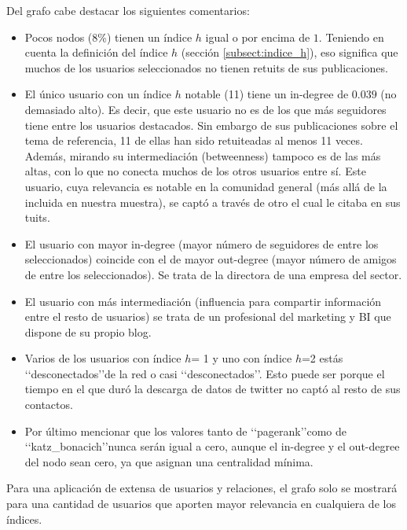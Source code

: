 Del grafo cabe destacar los siguientes comentarios:
\begin{itemize}
\item Pocos nodos ($8$\%) tienen un índice $h$ igual o por encima de $1$. Teniendo en cuenta 
la definición del índice $h$ (sección \ref{subsect:indice_h}), eso significa que muchos de los 
usuarios seleccionados no tienen retuits de sus publicaciones.

\item El único usuario con un índice $h$ notable (11) tiene un in-degree de $0.039$ (no demasiado alto). 
Es decir, que este usuario no es de los que más seguidores tiene entre los usuarios destacados. Sin
embargo de sus publicaciones sobre el tema de referencia, 11 de ellas han sido retuiteadas al menos
11 veces. Además, mirando su intermediación (betweenness) tampoco es de las más altas, con lo que 
no conecta muchos de los otros usuarios entre sí. Este usuario, cuya relevancia es notable en la comunidad
general (más allá de la incluida en nuestra muestra), se captó a través de otro el cual le citaba en 
sus tuits. 


\item El usuario con mayor in-degree (mayor número de seguidores de entre los seleccionados) coincide 
con el de mayor out-degree (mayor número de amigos de entre los seleccionados). Se trata de la 
directora de una empresa del sector. 

\item El usuario con más intermediación (influencia para compartir información entre el resto de usuarios) se trata de un profesional del marketing y BI que dispone de su propio blog.


\item Varios de los usuarios con índice $h$= 1 y uno con índice $h$=2 estás \lq\lq desconectados\rq\rq de la red o casi \lq\lq desconectados\rq\rq. Esto puede ser porque el tiempo en el que duró la descarga de datos de twitter no captó al resto de sus contactos.


\item Por último mencionar que los valores tanto de \lq\lq pagerank\rq\rq como de
\lq\lq katz\_bonacich\rq\rq nunca serán igual a cero, aunque el in-degree y el out-degree del nodo 
sean cero, ya que asignan una centralidad mínima.
\end{itemize}

Para una aplicación de extensa de usuarios y relaciones, el grafo solo se mostrará para una cantidad de usuarios que aporten mayor relevancia en cualquiera de los índices.